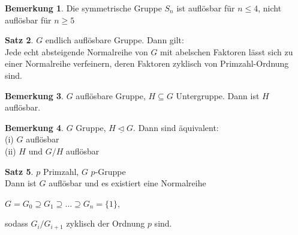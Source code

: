 \documentclass[10pt,a4paper,numbers=endperiod]{scrreprt}
\theoremstyle{definition}
\newtheorem{satz}{Satz}[section]
\newtheorem{bem}[satz]{Bemerkung}
\begin{document}
\begin{bem}
	Die symmetrische Gruppe $S_n$ ist auflösbar für $n \leq 4$, nicht auflösbar für $n \geq 5$
\end{bem}

\begin{satz}
	$G$ endlich auflösbare Gruppe. Dann gilt:\\
	Jede echt absteigende Normalreihe von $G$ mit abelschen Faktoren lässt sich zu einer Normalreihe verfeinern, deren Faktoren zyklisch von Primzahl-Ordnung sind.
\end{satz}

\begin{bem}
	$G$ auflösbare Gruppe, $H \subseteq G$ Untergruppe. Dann ist $H$ auflösbar.
\end{bem}

\begin{bem}
	$G$ Gruppe, $H \underline{\vartriangleleft} G$. Dann sind äquivalent:\\
	(i) $G$ auflösbar\\
	(ii) $H$ und $G/H$ auflösbar
\end{bem}

\begin{satz}
	$p$ Primzahl, $G$ $p$-Gruppe\\
	Dann ist $G$ auflösbar und es existiert eine Normalreihe\\
	\begin{center}
		$G = G_0 \supseteq G_1 \supseteq \ldots \supseteq G_n = \{1\}$,
	\end{center}
	sodass $G_i/G_{i+1}$ zyklisch der Ordnung $p$ sind.
\end{satz}
\end{document}
